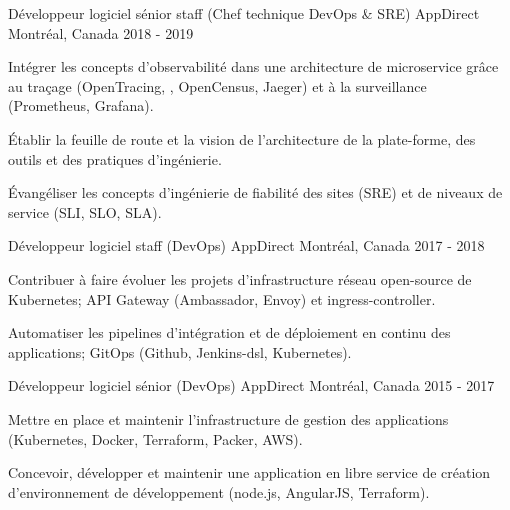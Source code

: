 \begin{cventries}
  \cventry
    {Développeur logiciel sénior staff (Chef technique DevOps \& SRE)} %
    {AppDirect} %
    {Montréal, Canada} %
    {2018 - 2019} %
    {
      \begin{cvitems} %
        \item {Intégrer les concepts d'observabilité dans une architecture de microservice grâce au traçage (OpenTracing, , OpenCensus, Jaeger) et à la surveillance (Prometheus, Grafana).}
        \item {Établir la feuille de route et la vision de l'architecture de la plate-forme, des outils et des pratiques d'ingénierie.}
        \item {Évangéliser les concepts d'ingénierie de fiabilité des sites (SRE) et de niveaux de service (SLI, SLO, SLA).}
      \end{cvitems}
    }

  \cventry
    {Développeur logiciel staff (DevOps)} %
    {AppDirect} %
    {Montréal, Canada} %
    {2017 - 2018} %
    {
      \begin{cvitems} %
        \item {Contribuer à faire évoluer les projets d'infrastructure réseau open-source de Kubernetes; API Gateway (Ambassador, Envoy) et ingress-controller.}
        \item {Automatiser les pipelines d'intégration et de déploiement en continu des applications; GitOps (Github, Jenkins-dsl, Kubernetes).}
      \end{cvitems}
    }

  \cventry
    {Développeur logiciel sénior (DevOps)} %
    {AppDirect} %
    {Montréal, Canada} %
    {2015 - 2017} %
    {
      \begin{cvitems} %
        \item {Mettre en place et maintenir l'infrastructure de gestion des applications (Kubernetes, Docker, Terraform, Packer, AWS).}
        \item {Concevoir, développer et maintenir une application en libre service de création d'environnement de développement (node.js, AngularJS, Terraform).}
      \end{cvitems}
    }


\end{cventries}
